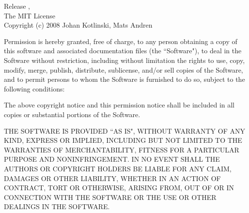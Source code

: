 

\setlength{\parindent}{0pt}

Release \texttt{\revisiontagdoc}, \space \revisiondate\\[18pt]

The MIT License\\

Copyright (c) 2008 \space Johan Kotlinski, Mats Andren

\begin{flushleft}
Permission is hereby granted, free of charge, to any person obtaining a copy
of this software and associated documentation files (the ``Software"), to deal
in the Software without restriction, including without limitation the rights
to use, copy, modify, merge, publish, distribute, sublicense, and/or sell
copies of the Software, and to permit persons to whom the Software is
furnished to do so, subject to the following conditions:
\end{flushleft}

\begin{flushleft}
The above copyright notice and this permission notice shall be included in
all copies or substantial portions of the Software.
\end{flushleft}

\begin{flushleft}
THE SOFTWARE IS PROVIDED ``AS IS", WITHOUT WARRANTY OF ANY KIND, EXPRESS OR
IMPLIED, INCLUDING BUT NOT LIMITED TO THE WARRANTIES OF MERCHANTABILITY,
FITNESS FOR A PARTICULAR PURPOSE AND NONINFRINGEMENT. IN NO EVENT SHALL THE
AUTHORS OR COPYRIGHT HOLDERS BE LIABLE FOR ANY CLAIM, DAMAGES OR OTHER
LIABILITY, WHETHER IN AN ACTION OF CONTRACT, TORT OR OTHERWISE, ARISING FROM,
OUT OF OR IN CONNECTION WITH THE SOFTWARE OR THE USE OR OTHER DEALINGS IN
THE SOFTWARE.
\end{flushleft}

